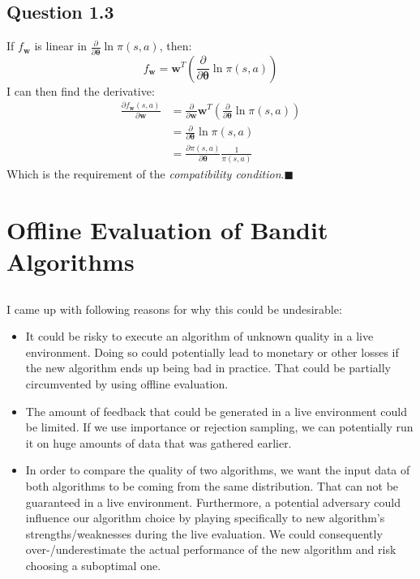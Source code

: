 \documentclass[a4paper]{article}
\newcommand*{\QEDA}{\hfill\ensuremath{\blacksquare}}%
\newcommand*{\bs}[1]{\boldsymbol{#1}}
\begin{document}
\subsection*{Question 1.3}
\label{subsec:13}
If $f_{\boldsymbol{w}}$ is linear in $\frac{\partial}{\partial
  \boldsymbol{\theta}} \ln \pi(s, a)$, then: 
\[
f_{\boldsymbol{w}} = \bs{w}^T \left(\frac{\partial}{\partial \boldsymbol{\theta}} \ln \pi(s, a)\right)
\]
I can then find the derivative:
\begin{align*}
  \frac{\partial f_{\bs{w}} (s,a)}{\partial \boldsymbol{w}} &=
  \frac{\partial}{\partial \boldsymbol{w}} \bs{w}^T
  \left(\frac{\partial}{\partial \boldsymbol{\theta}} \ln \pi(s, a)\right)\\
  &=
  \frac{\partial}{\partial \boldsymbol{\theta}} \ln \pi(s, a)\\
  &= \frac{\partial \pi(s,a)}{\partial
    \bs{\theta}}\frac{1}{\pi(s, a)} \tag{using chain rule}
\end{align*}
Which is the requirement of the \emph{compatibility condition}.\QEDA

\section{Offline Evaluation of Bandit Algorithms}
\label{sec:2}
\subsection{}
\label{subsec:21}
I came up with following reasons for why this could be undesirable:
\begin{itemize}
\item It could be risky to execute an algorithm of unknown quality in a live
  environment. Doing so could potentially lead to monetary or other losses if the new
  algorithm ends up being bad in practice. That could be partially circumvented by
  using offline evaluation.
\item The amount of feedback that could be generated in a live environment could
  be limited. If we use importance or rejection sampling, we can potentially run it on
  huge amounts of data that was gathered earlier.
\item In order to compare the quality of two algorithms, we want the input data
  of both algorithms to be coming from the same distribution. That can not be
  guaranteed in a live environment. Furthermore, a potential adversary could
  influence our algorithm choice by playing specifically to new algorithm's
  strengths/weaknesses during the live evaluation.
  We could consequently over-/underestimate the actual performance of the new
  algorithm and risk choosing a suboptimal one.
\end{itemize}
\end{document}
